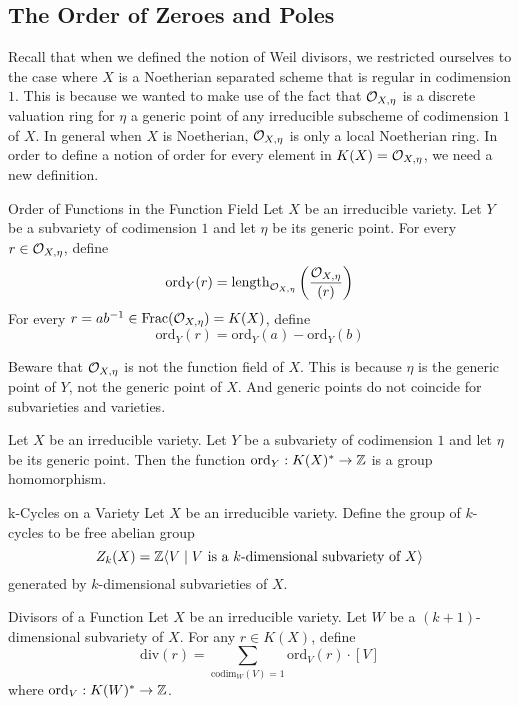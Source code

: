 \documentclass[a4paper]{article}
\begin{document}
\subsection{The Order of Zeroes and Poles}
Recall that when we defined the notion of Weil divisors, we restricted ourselves to the case where $X$ is a Noetherian separated scheme that is regular in codimension $1$. This is because we wanted to make use of the fact that $\mathcal{O}_{X,\eta}$ is a discrete valuation ring for $\eta$ a generic point of any irreducible subscheme of codimension $1$ of $X$. In general when $X$ is Noetherian, $\mathcal{O}_{X,\eta}$ is only a local Noetherian ring. In order to define a notion of order for every element in $K(X)=\mathcal{O}_{X,\eta}$, we need a new definition. 

\begin{defn}{Order of Functions in the Function Field}{} Let $X$ be an irreducible variety. Let $Y$ be a subvariety of codimension $1$ and let $\eta$ be its generic point. For every $r\in\mathcal{O}_{X,\eta}$, define $$\text{ord}_Y(r)=\text{length}_{\mathcal{O}_{X,\eta}}\left(\frac{\mathcal{O}_{X,\eta}}{(r)}\right)$$ For every $r=ab^{-1}\in\text{Frac}(\mathcal{O}_{X,\eta})=K(X)$, define $$\text{ord}_Y(r)=\text{ord}_Y(a)-\text{ord}_Y(b)$$
\end{defn}

Beware that $\mathcal{O}_{X,\eta}$ is not the function field of $X$. This is because $\eta$ is the generic point of $Y$, not the generic point of $X$. And generic points do not coincide for subvarieties and varieties. 

\begin{lmm}{}{} Let $X$ be an irreducible variety. Let $Y$ be a subvariety of codimension $1$ and let $\eta$ be its generic point. Then the function $\text{ord}_Y:K(X)^\ast\to\mathbb{Z}$ is a group homomorphism. 
\end{lmm}

\begin{defn}{k-Cycles on a Variety}{} Let $X$ be an irreducible variety. Define the group of $k$-cycles to be free abelian group $$Z_k(X)=\mathbb{Z}\langle V\;|\;V\text{ is a }k\text{-dimensional subvariety of }X\rangle$$ generated by $k$-dimensional subvarieties of $X$. 
\end{defn}

\begin{defn}{Divisors of a Function}{} Let $X$ be an irreducible variety. Let $W$ be a $(k+1)$-dimensional subvariety of $X$. For any $r\in K(X)$, define $$\text{div}(r)=\sum_{\text{codim}_W(V)=1}\text{ord}_V(r)\cdot[V]$$ where $\text{ord}_V:K(W)^\ast\to\mathbb{Z}$. 
\end{defn}
\end{document}
